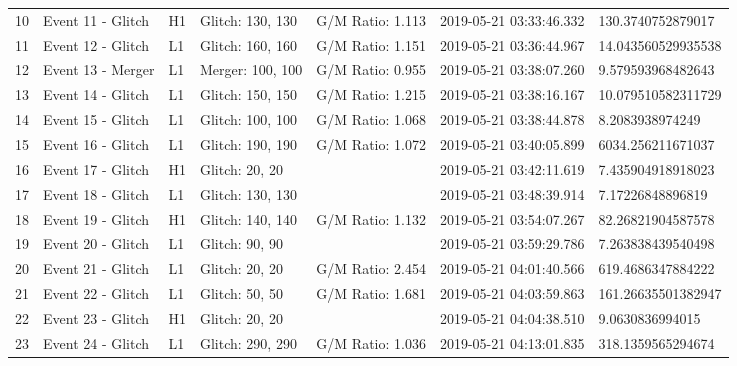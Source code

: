 \begin{longtable}{lllllll}
10 &                                  Event 11 - Glitch &       H1 &  Glitch: 130, 130 &  G/M Ratio: 1.113 &  2019-05-21 03:33:46.332 &  130.3740752879017 \\
11 &                                  Event 12 - Glitch &       L1 &  Glitch: 160, 160 &  G/M Ratio: 1.151 &  2019-05-21 03:36:44.967 &   14.043560529935538 \\
12 &                                  Event 13 - Merger &       L1 &  Merger: 100, 100 &  G/M Ratio: 0.955 &  2019-05-21 03:38:07.260 &    9.579593968482643 \\
13 &                                  Event 14 - Glitch &       L1 &  Glitch: 150, 150 &  G/M Ratio: 1.215 &  2019-05-21 03:38:16.167 &   10.079510582311729 \\
14 &                                  Event 15 - Glitch &       L1 &  Glitch: 100, 100 &  G/M Ratio: 1.068 &  2019-05-21 03:38:44.878 &    8.2083938974249 \\
15 &                                  Event 16 - Glitch &       L1 &  Glitch: 190, 190 &  G/M Ratio: 1.072 &  2019-05-21 03:40:05.899 & 6034.256211671037 \\
16 &                                  Event 17 - Glitch &       H1 &    Glitch: 20, 20 &                   &  2019-05-21 03:42:11.619 &    7.435904918918023 \\
17 &                                  Event 18 - Glitch &       L1 &  Glitch: 130, 130 &                   &  2019-05-21 03:48:39.914 &    7.17226848896819 \\
18 &                                  Event 19 - Glitch &       H1 &  Glitch: 140, 140 &  G/M Ratio: 1.132 &  2019-05-21 03:54:07.267 &   82.26821904587578 \\
19 &                                  Event 20 - Glitch &       L1 &    Glitch: 90, 90 &                   &  2019-05-21 03:59:29.786 &    7.263838439540498 \\
20 &                                  Event 21 - Glitch &       L1 &    Glitch: 20, 20 &  G/M Ratio: 2.454 &  2019-05-21 04:01:40.566 &  619.4686347884222 \\
21 &                                  Event 22 - Glitch &       L1 &    Glitch: 50, 50 &  G/M Ratio: 1.681 &  2019-05-21 04:03:59.863 &  161.26635501382947 \\
22 &                                  Event 23 - Glitch &       H1 &    Glitch: 20, 20 &                   &  2019-05-21 04:04:38.510 &    9.0630836994015 \\
23 &                                  Event 24 - Glitch &       L1 &  Glitch: 290, 290 &  G/M Ratio: 1.036 &  2019-05-21 04:13:01.835 &  318.1359565294674 \\

\end{longtable}
